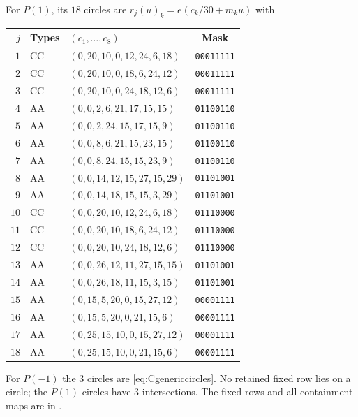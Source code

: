 \documentclass[11pt,a4paper]{article}
\theoremstyle{plain}
\theoremstyle{definition}
\numberwithin{equation}{section}
\begin{document}
For $P(1)$, its $18$ circles are $r_j(u)_k=e(c_k/30+m_ku)$ with
{\small\setlength{\tabcolsep}{4pt}\begin{longtable}{rllc}\toprule
$j$&Types&$(c_1,\ldots,c_8)$&Mask\\\midrule\endhead
$1$&CC&$(0,20,10,0,12,24,6,18)$&\texttt{00011111}\\
$2$&CC&$(0,20,10,0,18,6,24,12)$&\texttt{00011111}\\
$3$&CC&$(0,20,10,0,24,18,12,6)$&\texttt{00011111}\\
$4$&AA&$(0,0,2,6,21,17,15,15)$&\texttt{01100110}\\
$5$&AA&$(0,0,2,24,15,17,15,9)$&\texttt{01100110}\\
$6$&AA&$(0,0,8,6,21,15,23,15)$&\texttt{01100110}\\
$7$&AA&$(0,0,8,24,15,15,23,9)$&\texttt{01100110}\\
$8$&AA&$(0,0,14,12,15,27,15,29)$&\texttt{01101001}\\
$9$&AA&$(0,0,14,18,15,15,3,29)$&\texttt{01101001}\\
$10$&CC&$(0,0,20,10,12,24,6,18)$&\texttt{01110000}\\
$11$&CC&$(0,0,20,10,18,6,24,12)$&\texttt{01110000}\\
$12$&CC&$(0,0,20,10,24,18,12,6)$&\texttt{01110000}\\
$13$&AA&$(0,0,26,12,11,27,15,15)$&\texttt{01101001}\\
$14$&AA&$(0,0,26,18,11,15,3,15)$&\texttt{01101001}\\
$15$&AA&$(0,15,5,20,0,15,27,12)$&\texttt{00001111}\\
$16$&AA&$(0,15,5,20,0,21,15,6)$&\texttt{00001111}\\
$17$&AA&$(0,25,15,10,0,15,27,12)$&\texttt{00001111}\\
$18$&AA&$(0,25,15,10,0,21,15,6)$&\texttt{00001111}\\
\bottomrule\end{longtable}}
For $P(-1)$ the $3$ circles are \eqref{eq:Cgenericcircles}. No retained fixed row lies on a circle; the $P(1)$ circles have $3$ intersections. The fixed rows and all containment maps are in .
\end{document}
